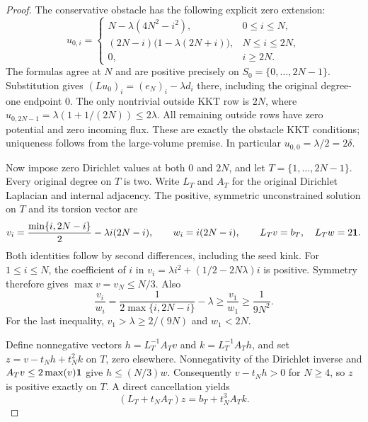 \begin{proof}
The conservative obstacle has the following explicit zero extension:
\[
 u_{0,i}=\begin{cases}
 N-\lambda(4N^2-i^2),&0\leq i\leq N,\\
 (2N-i)\bigl(1-\lambda(2N+i)\bigr),&N\leq i\leq2N,\\
 0,&i\geq2N.
 \end{cases}
\]
The formulas agree at $N$ and are positive precisely on
$S_0=\{0,\ldots,2N-1\}$. Substitution gives
$(Lu_0)_i=(e_N)_i-\lambda d_i$ there, including the original degree-one
endpoint $0$. The only nontrivial outside KKT row is $2N$, where
$u_{0,2N-1}=\lambda(1+1/(2N))\leq2\lambda$.
All remaining outside rows have zero potential and zero incoming flux.
These are exactly the obstacle KKT conditions; uniqueness follows from
the large-volume premise. In particular $u_{0,0}=\lambda/2=2\delta$.

Now impose zero Dirichlet values at both $0$ and $2N$, and let
$T=\{1,\ldots,2N-1\}$. Every original degree on $T$ is two.
Write $L_T$ and $A_T$ for the original Dirichlet Laplacian and internal
adjacency. The positive, symmetric unconstrained solution on $T$ and
its torsion vector are
\[
 v_i=\frac{\min\{i,2N-i\}}2-\lambda i(2N-i),\qquad
 w_i=i(2N-i),
 \qquad L_Tv=b_T,\quad L_Tw=2\mathbf{1}.
\]
Both identities follow by second differences, including the seed kink.
For $1\leq i\leq N$, the coefficient of $i$ in
$v_i=\lambda i^2+(1/2-2N\lambda)i$ is positive. Symmetry therefore
gives $\max v=v_N\leq N/3$. Also
\[
 \frac{v_i}{w_i}
 =\frac{1}{2\max\{i,2N-i\}}-\lambda
 \geq\frac{v_1}{w_1}\geq\frac1{9N^2}.
\]
For the last inequality, $v_1>\lambda\geq2/(9N)$ and $w_1<2N$.

Define nonnegative vectors
$h=L_T^{-1}A_Tv$ and $k=L_T^{-1}A_Th$, and set
$z=v-t_Nh+t_N^2k$ on $T$, zero elsewhere.
Nonnegativity of the Dirichlet inverse and $A_Tv\leq2\max(v)\mathbf{1}$
give $h\leq(N/3)w$. Consequently $v-t_Nh>0$ for $N\geq4$,
so $z$ is positive exactly on $T$. A direct cancellation yields
\begin{equation}
 (L_T+t_NA_T)z=b_T+t_N^3A_Tk.
 \label{eq:op3-path-certificate-cancellation}
\end{equation}


\end{proof}
